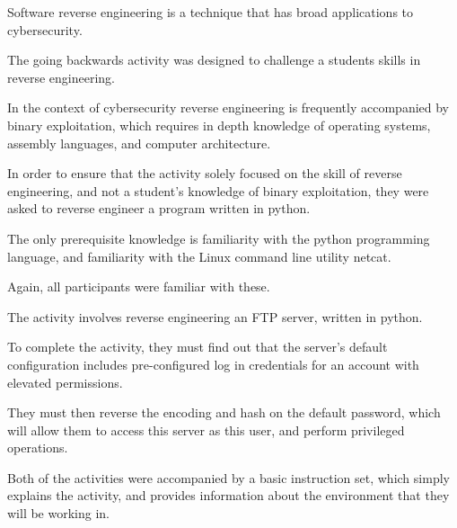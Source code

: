 


    Software reverse engineering is a technique that has broad applications to cybersecurity. %



The going backwards activity was designed to challenge a students skills in reverse engineering. %



In the context of cybersecurity reverse engineering is frequently accompanied by binary exploitation, which requires in depth knowledge of operating systems, assembly languages, and computer architecture. %



In order to ensure that the activity solely focused on the skill of reverse engineering, and not a student's knowledge of binary exploitation, they were asked to reverse engineer a program written in python. %



The only prerequisite knowledge is familiarity with the python programming language, and familiarity with the Linux command line utility netcat. %



Again, all participants were familiar with these.







    The activity involves reverse engineering an FTP server, written in python. %



To complete the activity, they must find out that the server's default configuration includes pre-configured log in credentials for an account with elevated permissions. %



They must then reverse the encoding and hash on the default password, which will allow them to access this server as this user, and perform privileged operations. 










    Both of the activities were accompanied by a basic instruction set, which simply explains the activity, and provides information about the environment that they will be working in. %



